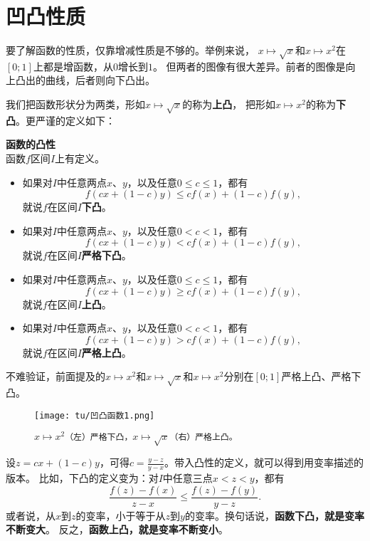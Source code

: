 \documentclass[12pt,UTF8]{ctexbook}
\begin{document}
\section{凹凸性质}

要了解函数的性质，仅靠增减性质是不够的。举例来说，
$x\mapsto \sqrt{x}$和$x\mapsto x^2$在$[0;1]$上都是增函数，从$0$增长到$1$。
但两者的图像有很大差异。前者的图像是向上凸出的曲线，后者则向下凸出。

我们把函数形状分为两类，形如$x\mapsto \sqrt{x}$的称为\textbf{上凸}，
把形如$x\mapsto x^2$的称为\textbf{下凸}。更严谨的定义如下：

\begin{df}{\textbf{函数的凸性}}
    \mbox{} \\
    函数$f$区间$I$上有定义。
    \begin{itemize}
        \item 如果对$I$中任意两点$x$、$y$，以及任意$0 \leqslant c \leqslant 1$，都有
        $$ f(cx + (1 - c)y) \leqslant cf(x) + (1 - c)f(y), $$
        就说$f$在区间$I$\textbf{下凸}。
        \item 如果对$I$中任意两点$x$、$y$，以及任意$0 < c < 1$，都有
        $$ f(cx + (1 - c)y) < cf(x) + (1 - c)f(y), $$
        就说$f$在区间$I$\textbf{严格下凸}。
        \item 如果对$I$中任意两点$x$、$y$，以及任意$0 \leqslant c \leqslant 1$，都有
        $$ f(cx + (1 - c)y) \geqslant cf(x) + (1 - c)f(y), $$
        就说$f$在区间$I$\textbf{上凸}。
        \item 如果对$I$中任意两点$x$、$y$，以及任意$0 < c < 1$，都有
        $$ f(cx + (1 - c)y) > cf(x) + (1 - c)f(y), $$
        就说$f$在区间$I$\textbf{严格上凸}。
    \end{itemize}
\end{df}

不难验证，前面提及的$x\mapsto x^2$和$x\mapsto \sqrt{x}$和$x\mapsto x^2$分别在$[0;1]$严格上凸、严格下凸。

\begin{figure}[h]
    \centering
    \texttt{[image: tu/凹凸函数1.png]}
    \caption*{$x\mapsto x^2$\texttt{（左）严格下凸，}$x\mapsto \sqrt{x}$\texttt{（右）严格上凸。}}
\end{figure}

设$z = cx + (1 - c)y$，可得$c = \frac{y - z}{y - x}$。带入凸性的定义，就可以得到用变率描述的版本。
比如，下凸的定义变为：对$I$中任意三点$x < z < y$，都有
$$ \frac{f(z) - f(x)}{z - x} \leqslant \frac{f(z) - f(y)}{y - z}. $$
或者说，从$x$到$z$的变率，小于等于从$z$到$y$的变率。换句话说，\textbf{函数下凸，就是变率不断变大}。
反之，\textbf{函数上凸，就是变率不断变小}。
\end{document}
